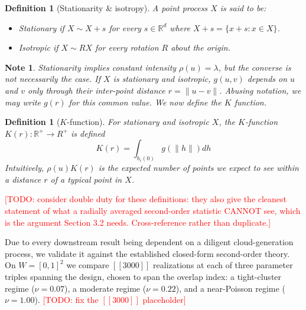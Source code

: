 \documentclass[11pt,letterpaper]{article}
\newcommand{\R}{\mathbb{R}}
\newcommand{\1}{\mathds{1}}
\newcommand{\todo}[1]{\textcolor{red}{[TODO: #1]}}
\newcommand{\todo}[1]{}
\theoremstyle{plain}
\theoremstyle{definitioncolon}
\newtheorem{definition}[theorem]{Definition}
\newtheorem*{note}{Note}
\begin{document}
    \begin{definition}[Stationarity \& isotropy]
        A point process $X$ is said to be:
            \begin{itemize}
                \item \emph{Stationary} if $X \sim X + s$ for every
                $s \in \R^d$ where $X + s = \{x + s: x \in X\}$.
                \item \emph{Isotropic} if $X \sim RX$ for every rotation $R$
                about the origin.
            \end{itemize}
    \end{definition}

    \begin{note}
        Stationarity implies constant intensity $\rho(u) = \lambda$, but the
        converse is not necessarily the case. If $X$ is stationary and isotropic,
        $g(u, v)$ depends on $u$ and $v$ only through their inter-point distance
        $r = \|u - v\|$. Abusing notation, we may write $g(r)$ for this common
        value. We now define the $K$ function.
    \end{note}

    \begin{definition}[$K$-function]
        For stationary and isotropic $X$, the $K$-function
        $K(r): \R^+ \rightarrow R^+$ is defined
            \[
            K(r) = \int_{b_r(0)} g(\|h\|) dh
            \]
        Intuitively, $\rho(u)K(r)$ is the expected number of points we expect to
        see within a distance $r$ of a typical point in $X$.
    \end{definition}

\todo{consider double duty for these definitions: they also give the cleanest
statement of what a radially averaged second-order statistic CANNOT see, which
is the argument Section 3.2 needs. Cross-reference rather than duplicate.}

Due to every downstream result being dependent on a diligent cloud-generation
process, we validate it against the established closed-form second-order theory.
On $W = [0,1]^2$ we compare $[[3000]]$ realizations at each of three parameter
triples spanning the design, chosen to span the overlap index: a tight-cluster
regime ($\nu = 0.07$), a moderate regime ($\nu = 0.22$), and a near-Poisson
regime ($\nu = 1.00$).
\todo{fix the $[[3000]]$ placeholder}
\end{document}
